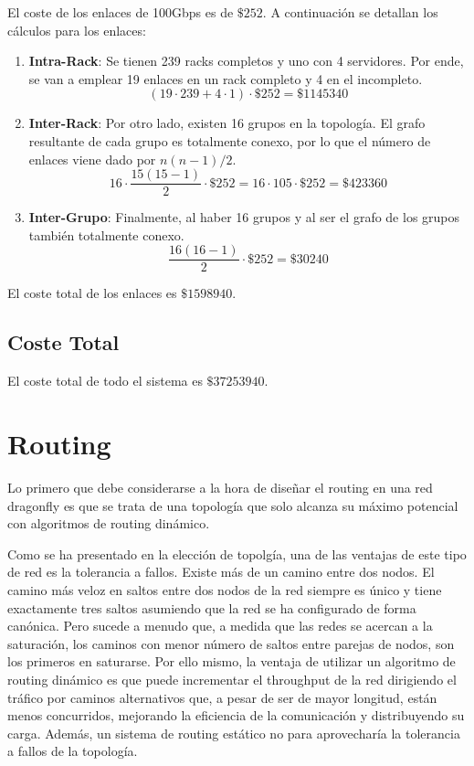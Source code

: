 \documentclass[%
    school=etsisi,%
    degree=61TI,%
]{upm-report}
\begin{document}
El coste de los enlaces de 100Gbps es de $\$ 252$. A continuación se detallan los cálculos para los enlaces:

\begin{enumerate}
    \item \textbf{Intra-Rack}: Se tienen 239 racks completos y uno con 4 servidores. Por ende, se van a emplear 19 enlaces en un rack completo y 4 en el incompleto. $$\left ( 19 \cdot 239 + 4 \cdot 1 \right ) \cdot \$ 252 = \$ 1145340$$
    \item \textbf{Inter-Rack}: Por otro lado, existen 16 grupos en la topología. El grafo resultante de cada grupo es totalmente conexo, por lo que el número de enlaces viene dado por $n(n-1) / 2$. $$16 \cdot \frac{15 (15 - 1)}{2} \cdot \$ 252 = 16 \cdot 105 \cdot \$ 252 = \$ 423360$$
    \item \textbf{Inter-Grupo}: Finalmente, al haber 16 grupos y al ser el grafo de los grupos también totalmente conexo. $$\frac{16 (16 - 1)}{2} \cdot \$ 252 = \$ 30240$$
\end{enumerate}

El coste total de los enlaces es $\$ 1598940$.

\subsection{Coste Total}

El coste total de todo el sistema es $\$ 37253940$.

\section{Routing}
\label{sec:routing}

Lo primero que debe considerarse a la hora de diseñar el routing en una red dragonfly es que se trata de una topología que solo alcanza su máximo potencial con algoritmos de routing dinámico. 

Como se ha presentado en la elección de topolgía, una de las ventajas de este tipo de red es la tolerancia a fallos. Existe más de un camino entre dos nodos. El camino más veloz en saltos entre dos nodos de la red siempre es único y tiene exactamente tres saltos asumiendo que la red se ha configurado de forma canónica. Pero sucede a menudo que, a medida que las redes se acercan a la saturación, los caminos con menor número de saltos entre parejas de nodos, son los primeros en saturarse. Por ello mismo, la ventaja de utilizar un algoritmo de routing dinámico es que puede incrementar el throughput de la red dirigiendo el tráfico por caminos alternativos que, a pesar de ser de mayor longitud, están menos concurridos, mejorando la eficiencia de la comunicación y distribuyendo su carga. Además, un sistema de routing estático no para aprovecharía la tolerancia a fallos de la topología.
\end{document}
